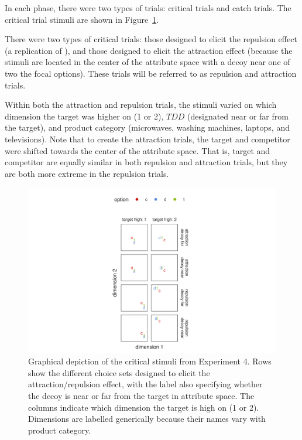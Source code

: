 In each phase, there were two types of trials: critical trials and catch trials. The critical trial stimuli are shown in Figure~\ref{fig:ce_rating_stim}. 

There were two types of critical trials: those designed to elicit the repulsion effect (a replication of \citeauthor{banerjeeFactorsThatPromote2024}), and those designed to elicit the attraction effect (because the stimuli are located in the center of the attribute space with a decoy near one of two the focal options). These trials will be referred to as repulsion and attraction trials.

Within both the attraction and repulsion trials, the stimuli varied on which dimension the target was higher on (1 or 2), $TDD$ (designated near or far from the target), and product category (microwaves, washing machines, laptops, and televisions). Note that to create the attraction trials, the target and competitor were shifted towards the center of the attribute space. That is, target and competitor are equally similar in both repulsion and attraction trials, but they are both more extreme in the repulsion trials.

\begin{figure}
    \includegraphics[width=150mm,scale=0.5]{figures/ce_rating_stim_for_paper.jpeg}
    \caption{Graphical depiction of the critical stimuli from Experiment 4. Rows show the different choice sets designed to elicit the attraction/repulsion effect, with the label also specifying whether the decoy is near or far from the target in attribute space. The columns indicate which dimension the target is high on (1 or 2). Dimensions are labelled generically because their names vary with product category.}
    \label{fig:ce_rating_stim}
\end{figure}

